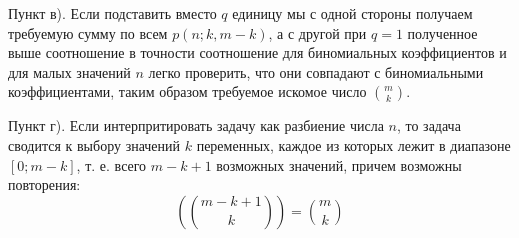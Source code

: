 \documentclass[a4paper,12pt]{article}
\begin{document}
\begin{Solution}
Пункт в). Если подставить вместо $q$ единицу мы с одной стороны получаем требуемую сумму по всем $p\left(n;k,m-k\right)$, а с другой при $q = 1$ полученное выше соотношение в точности соотношение для биномиальных коэффициентов и для малых значений $n$ легко проверить, что они совпадают с биномиальными коэффициентами, таким образом требуемое искомое число $\binom{m}{k}$.

Пункт г). Если интерпритировать задачу как разбиение числа $n$, то задача сводится к выбору значений $k$ переменных, каждое из которых лежит в диапазоне $[0;m-k]$, т. е. всего $m-k+1$ возможных значений, причем возможны повторения:
\[
	\left(\binom{m-k+1}{k}\right) = \binom{m}{k}
\]
\end{Solution}
\end{document}

